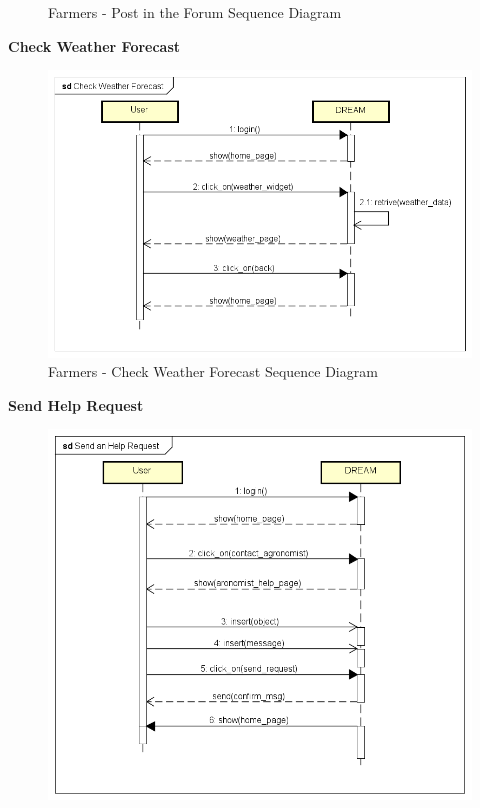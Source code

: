 \documentclass[table, 12pt]{article}
\begin{document}
\begin{itemize}
\begin{center}
\begin{figure}[H]
                    \caption{Farmers - Post in the Forum Sequence Diagram}
                    \label{fig: sequence_forum}
                \end{figure}
            \end{center}
            
            \textbf{Check Weather Forecast}\\
            \begin{center}
                \begin{figure}[H]
                    \includegraphics[scale=0.60, center]{assets/Sequence diagrams/Farmer/Check Weather Forecast.png}
                    \caption{Farmers - Check Weather Forecast Sequence Diagram}
                    \label{fig: sequence_weatherfarmers}
                \end{figure}
            \end{center}
            \newpage
            \textbf{Send Help Request}\\
            \begin{center}
                \begin{figure}[H]
                    \includegraphics[scale=0.60, center]{assets/Sequence diagrams/Farmer/Send an Help Request.png}

\end{figure}
\end{center}
\end{itemize}
\end{document}
